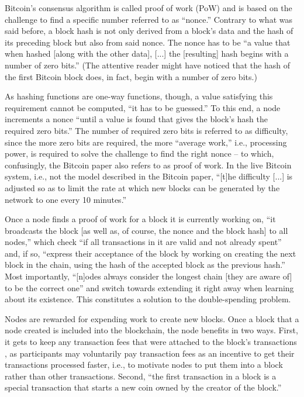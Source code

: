 Bitcoin's consensus algorithm is called proof of work (PoW) and is based on the challenge to find a specific number referred to as ``nonce.'' \autocite[3]{nakamoto2008}
Contrary to what was said before, a block hash is not only derived from a block's data and the hash of its preceding block but also from said nonce.
The nonce has to be ``a value that when hashed [along with the other data], [...] the [resulting] hash begins with a number of zero bits.'' \autocite[3]{nakamoto2008}
(The attentive reader might have noticed that the hash of the first Bitcoin block does, in fact, begin with a number of zero bits.)

As hashing functions are one-way functions, though, a value satisfying this requirement cannot be computed, ``it has to be guessed.'' \autocite[7]{baerenfaenger2020a}
To this end, a node increments a nonce ``until a value is found that gives the block's hash the required zero bits.'' \autocite[3]{nakamoto2008}
The number of required zero bits is referred to as difficulty, since the more zero bits are required, the more ``average work,'' \autocite[3]{nakamoto2008} i.e., processing power, is required to solve the challenge to find the right nonce -- to which, confusingly, the Bitcoin paper also refers to as proof of work. \autocite[3]{nakamoto2008}
In the live Bitcoin system, i.e., not the model described in the Bitcoin paper, ``[t]he difficulty [...] is adjusted so as to limit the rate at which new blocks can be generated by the network to one every 10 minutes.'' \autocite{bitcoinit2020a}

Once a node finds a proof of work for a block it is currently working on, ``it broadcasts the block [as well as, of course, the nonce and the block hash] to all nodes,'' which check ``if all transactions in it are valid and not already spent'' and, if so, ``express their acceptance of the block by working on creating the next block in the chain, using the hash of the accepted block as the previous hash.'' \autocite[3]{nakamoto2008}
Most importantly, ``[n]odes always consider the longest chain [they are aware of] to be the correct one'' and switch towards extending it right away when learning about its existence. \autocite[3]{nakamoto2008}
This constitutes a solution to the double-spending problem.

Nodes are rewarded for expending work to create new blocks.
Once a block that a node created is included into the blockchain, the node benefits in two ways.
First, it gets to keep any transaction fees that were attached to the block's transactions \autocite[4]{nakamoto2008}, as participants may voluntarily pay transaction fees as an incentive to get their transactions processed faster, i.e., to motivate nodes to put them into a block rather than other transactions.
Second, ``the first transaction in a block is a special transaction that starts a new coin owned by the creator of the block.'' \autocite[4]{nakamoto2008}

